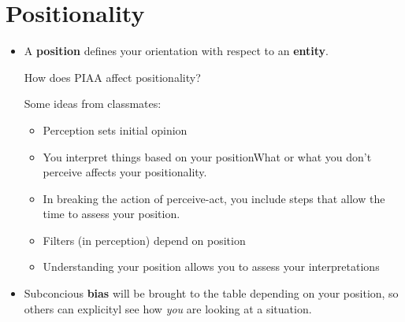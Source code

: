 \section{Positionality}
\begin{itemize}
    \item A \textbf{position} defines your orientation with respect to an \textbf{entity}.
    \begin{idea}
        How does PIAA affect positionality?
    \end{idea}
    Some ideas from classmates:
    \begin{itemize}
        \item Perception sets initial opinion
        \item You interpret things based on your positionWhat or what you don't perceive affects your positionality.
        \item In breaking the action of perceive-act, you include steps that allow the time to assess your position.
        \item Filters (in perception) depend on position
        \item Understanding your position allows you to assess your interpretations
    \end{itemize}
    \item Subconcious \textbf{bias} will be brought to the table depending on your position, so others can explicityl see how \textit{you} are looking at a situation. 
\end{itemize}
